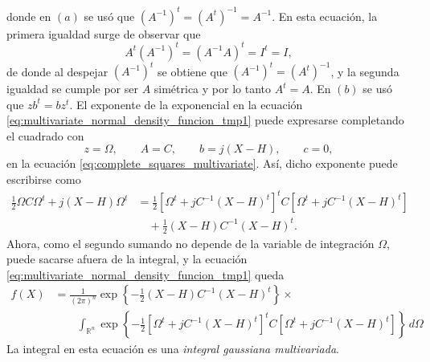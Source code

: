 \documentclass[a4paper]{report}
\begin{document}
\normalsize
donde en \((a)\) se usó que \((A^{-1})^t=(A^t)^{-1}=A^{-1}\). En esta ecuación, la primera igualdad surge de observar que
\[
 A^t(A^{-1})^t=(A^{-1}A)^t=I^t=I,
\]
de donde al despejar \((A^{-1})^t\) se obtiene que \((A^{-1})^t=(A^t)^{-1}\), y la segunda igualdad se cumple por ser \(A\) simétrica y por lo tanto \(A^t=A\). En \((b)\) se usó que \(zb^t=bz^t\). El exponente de la exponencial en la ecuación \ref{eq:multivariate_normal_density_funcion_tmp1} puede expresarse completando el cuadrado con
\[
 z=\Omega,\qquad A=C,\qquad b=j(X-H),\qquad c=0,
\]
en la ecuación \ref{eq:complete_squares_multivariate}. Así, dicho exponente puede escribirse como
\begin{align*}
 \frac{1}{2}\Omega C\Omega^t+j(X-H)\Omega^t&=\frac{1}{2}\left[\Omega^t+jC^{-1}(X-H)^t\right]^tC\left[\Omega^t+jC^{-1}(X-H)^t\right]\\
   &\quad+\frac{1}{2}\left(X-H\right)C^{-1}\left(X-H\right)^t.
\end{align*}
Ahora, como el segundo sumando no depende de la variable de integración \(\Omega\), puede sacarse afuera de la integral, y la ecuación \ref{eq:multivariate_normal_density_funcion_tmp1} queda
\begin{align}\label{eq:multivariate_normal_density_funcion_tmp2}
 f(X)&=\frac{1}{(2\pi)^n}\exp\left\{-\frac{1}{2}\left(X-H\right)C^{-1}\left(X-H\right)^t\right\}\times \nonumber\\
  &\qquad \int_{{\mathbb{R}^n}}\exp\left\{-\frac{1}{2}\left[\Omega^t+jC^{-1}(X-H)^t\right]^tC\left[\Omega^t+jC^{-1}(X-H)^t\right]\right\}\,d\Omega
\end{align}
La integral en esta ecuación es una \emph{integral gaussiana multivariada}. 
\end{document}
